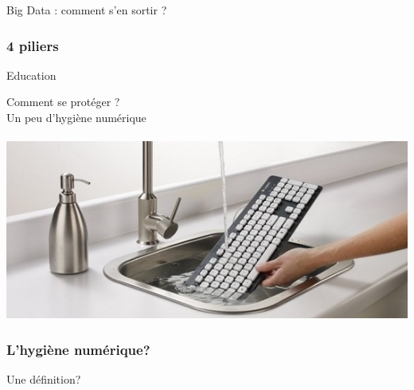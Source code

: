 \documentclass{beamer}
\begin{document}
\begin{frame}
\begin{center}
\Huge{Big Data : comment s'en sortir ?}
\end{center}
\end{frame}


\begin{frame}
\frametitle{4 piliers}
\begin{itemize}
\end{itemize}
\end{frame}
\begin{frame}
\begin{center}
\Huge {Education}
\end{center}
\end{frame}

\begin{frame}
\begin{center}
\Huge{Comment se protéger ?\\ Un peu d'hygiène numérique}
\\~\\
\includegraphics[scale=0.5]{./images/nettoyer_son_clavier.jpg}
\end{center}
\end{frame}

\begin{frame}
\frametitle{L'hygiène numérique?}
\begin{block}{Une définition?}
\end{block}
\end{frame}
\end{document}
